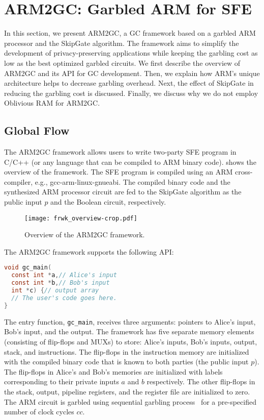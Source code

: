 \section{ARM2GC: Garbled ARM for SFE}
In this section, we present ARM2GC, a GC framework based on a garbled ARM processor and the SkipGate algorithm.
The framework aims to simplify the development of privacy-preserving applications while keeping the garbling cost as low as the best optimized garbled circuits.
We first describe the overview of ARM2GC and its API for GC development.
Then, we explain how ARM's unique architecture helps to decrease garbling overhead.
Next, the effect of SkipGate in reducing the garbling cost is discussed.
Finally, we discuss why we do not employ Oblivious RAM for ARM2GC.

\subsection{Global Flow}\label{ssec:arm-global}
The ARM2GC framework allows users to write two-party SFE program in C/C++ (or any language that can be compiled to ARM binary code).
 shows the overview of the framework.
The SFE program is compiled using an ARM cross-compiler, e.g., gcc-arm-linux-gnueabi.
The compiled binary code and the synthesized ARM processor circuit are fed to the SkipGate algorithm as the public input $p$ and the Boolean circuit, respectively.

\begin{figure}[ht]
\centering
\texttt{[image: frwk\_overview-crop.pdf]}
\caption{Overview of the ARM2GC framework.}\label{fig:frwk_overview}
\end{figure}

The ARM2GC framework supports the following API:
\begin{lstlisting}[language=C,basicstyle=\ttfamily,keywordstyle=\color{blue}\ttfamily,stringstyle=\color{red}\ttfamily,commentstyle=\color{CommentColor}\ttfamily]
void gc_main(
  const int *a,// Alice's input
  const int *b,// Bob's input
  int *c) {// output array
  // The user's code goes here.
}
\end{lstlisting}

The entry function, \texttt{gc\_main}, receives three arguments: pointers to Alice's input, Bob's input, and the output.
The framework has five separate memory elements (consisting of flip-flops and MUXs) to store: Alice's inputs, Bob's inputs, output, stack, and instructions.
The flip-flops in the instruction memory are initialized with the compiled binary code that is known to both parties (the public input $p$).
The flip-flops in Alice's and Bob's memories are initialized with labels corresponding to their private inputs $a$ and $b$ respectively.
The other flip-flops in the stack, output, pipeline registers, and the register file are initialized to zero.
The ARM circuit is garbled using sequential garbling process~\cite{songhori2015tinygarble} for a pre-specified number of clock cycles $cc$.

